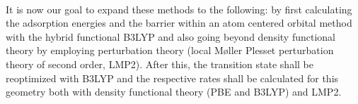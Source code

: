 \documentclass[11pt,DIV=13,BCOR=5mm,a4paper,headinclude]{scrbook}
\begin{document}
\\

It is now our goal to expand these methods to the following: by first calculating the adsorption energies and the barrier within an atom centered orbital method with the hybrid functional B3LYP and also going beyond density functional theory by employing perturbation theory (local M\o{}ller Plesset perturbation theory of second order, LMP2).
After this, the transition state shall be reoptimized with B3LYP and the respective rates shall be calculated for this geometry both with density functional theory (PBE and B3LYP) and LMP2.

\end{document}
